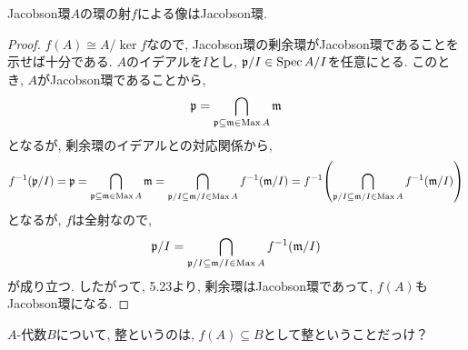 \documentclass[dvipdfmx]{jsarticle}
\begin{document}
    \begin{lemma}
        Jacobson環$A$の環の射$f$による像はJacobson環.
    \end{lemma}
    \begin{proof}
        $f(A) \cong A/\ker{f}$なので, Jacobson環の剰余環がJacobson環であることを示せば十分である.
        $A$のイデアルを$I$とし, $\mathfrak{p}/I \in \operatorname{Spec}{A/I}$を任意にとる.
        このとき, $A$がJacobson環であることから,
        \[
            \mathfrak{p} = \bigcap_{\mathfrak{p} \subseteq \mathfrak{m} \in \operatorname{Max}{A}} \mathfrak{m}
        \]
        となるが, 剰余環のイデアルとの対応関係から,
        \[
            f^{-1}(\mathfrak{p}/I) = \mathfrak{p} = \bigcap_{\mathfrak{p} \subseteq \mathfrak{m} \in \operatorname{Max}{A}} \mathfrak{m} = \bigcap_{\mathfrak{p}/I \subseteq \mathfrak{m}/I \in \operatorname{Max}{A}} f^{-1}(\mathfrak{m}/I) = f^{-1}\qty( \bigcap_{\mathfrak{p}/I \subseteq \mathfrak{m}/I \in \operatorname{Max}{A}} f^{-1}(\mathfrak{m}/I))
        \]
        となるが, $f$は全射なので,
        \[
            \mathfrak{p}/I = \bigcap_{\mathfrak{p}/I \subseteq \mathfrak{m}/I \in \operatorname{Max}{A}} f^{-1}(\mathfrak{m}/I)
        \]
        が成り立つ.
        したがって, 5.23より, 剰余環はJacobson環であって, $f(A)$もJacobson環になる.
    \end{proof}

    \color{red}
    $A$-代数$B$について, 整というのは, $f(A) \subseteq B$として整ということだっけ？
    \color{black}
\end{document}
